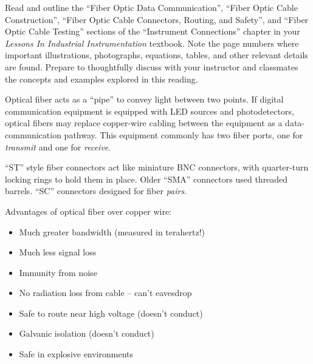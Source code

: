 

Read and outline the ``Fiber Optic Data Communication'',  ``Fiber Optic Cable Construction'', ``Fiber Optic Cable Connectors, Routing, and Safety'', and ``Fiber Optic Cable Testing'' sections of the ``Instrument Connections'' chapter in your {\it Lessons In Industrial Instrumentation} textbook.  Note the page numbers where important illustrations, photographs, equations, tables, and other relevant details are found.  Prepare to thoughtfully discuss with your instructor and classmates the concepts and examples explored in this reading.














Optical fiber acts as a ``pipe'' to convey light between two points.  If digital communication equipment is equipped with LED sources and photodetectors, optical fibers may replace copper-wire cabling between the equipment as a data-communication pathway.  This equipment commonly has two fiber ports, one for {\it transmit} and one for {\it receive}.

\vskip 10pt

``ST'' style fiber connectors act like miniature BNC connectors, with quarter-turn locking rings to hold them in place.  Older ``SMA'' connectors used threaded barrels.  ``SC'' connectors designed for fiber {\it pairs}.

\vskip 10pt

Advantages of optical fiber over copper wire:

\begin{itemize}
\item{} Much greater bandwidth (measured in terahertz!)
\item{} Much less signal loss
\item{} Immunity from noise
\item{} No radiation loss from cable -- can't eavesdrop
\item{} Safe to route near high voltage (doesn't conduct)
\item{} Galvanic isolation (doesn't conduct)
\item{} Safe in explosive environments
\end{itemize}

